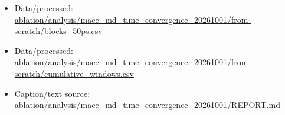 \begin{itemize}[leftmargin=1.4em,noitemsep]
\item Data/processed: \begingroup\scriptsize\url{ablation/analysis/mace_md_time_convergence_20261001/from-scratch/blocks_50ps.csv}\endgroup
\item Data/processed: \begingroup\scriptsize\url{ablation/analysis/mace_md_time_convergence_20261001/from-scratch/cumulative_windows.csv}\endgroup
\item Caption/text source: \begingroup\scriptsize\url{ablation/analysis/mace_md_time_convergence_20261001/REPORT.md}\endgroup
\end{itemize}
